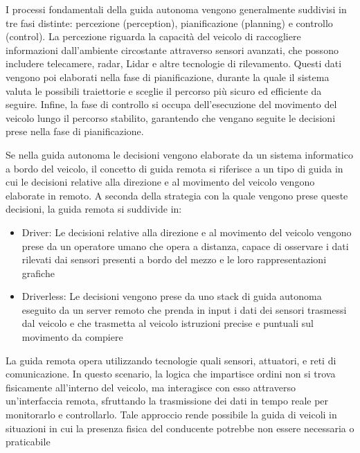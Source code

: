 \noindent I processi fondamentali della guida autonoma vengono generalmente suddivisi in tre fasi distinte: percezione (perception), pianificazione (planning) e controllo (control).
La percezione riguarda la capacità del veicolo di raccogliere informazioni dall'ambiente circostante attraverso sensori avanzati, che possono includere telecamere, radar, Lidar e altre tecnologie di rilevamento. Questi dati vengono poi elaborati nella fase di pianificazione, durante la quale il sistema valuta le possibili traiettorie e sceglie il percorso più sicuro ed efficiente da seguire. Infine, la fase di controllo si occupa dell'esecuzione del movimento del veicolo lungo il percorso stabilito, garantendo che vengano seguite le decisioni prese nella fase di pianificazione.

\noindent Se nella guida autonoma le decisioni vengono elaborate da un sistema informatico a bordo del veicolo, il concetto di guida remota si riferisce a un tipo di guida in cui le decisioni relative alla direzione e al movimento del veicolo vengono elaborate in remoto. A seconda della strategia con la quale vengono prese queste decisioni, la guida remota si suddivide in:




\begin{itemize}
    \item Driver: Le decisioni relative alla direzione e al movimento del veicolo vengono prese da un operatore umano che opera a distanza, capace di osservare i dati rilevati dai sensori presenti a bordo del mezzo e le loro rappresentazioni grafiche
    \item Driverless: Le decisioni vengono prese da uno stack di guida autonoma eseguito da un server remoto che prenda in input i dati dei sensori trasmessi dal veicolo e che trasmetta al veicolo istruzioni precise e puntuali sul movimento da compiere 
\end{itemize}

\noindent La guida remota opera utilizzando tecnologie quali sensori, attuatori, e reti di comunicazione. In questo scenario, la logica che impartisce ordini non si trova fisicamente all'interno del veicolo, ma interagisce con esso attraverso un'interfaccia remota, sfruttando la trasmissione dei dati in tempo reale per monitorarlo e controllarlo. Tale approccio rende possibile la guida di veicoli in situazioni in cui la presenza fisica del conducente potrebbe non essere necessaria o praticabile




